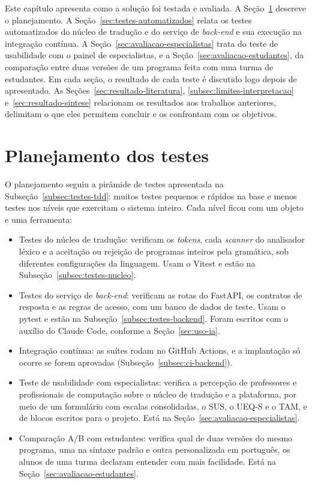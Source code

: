 Este capítulo apresenta como a solução foi testada e avaliada. A Seção~\ref{sec:planejamento-testes} descreve o planejamento. A Seção~\ref{sec:testes-automatizados} relata os testes automatizados do núcleo de tradução e do serviço de \textit{back-end} e sua execução na integração contínua. A Seção~\ref{sec:avaliacao-especialistas} trata do teste de usabilidade com o painel de especialistas, e a Seção~\ref{sec:avaliacao-estudantes}, da comparação entre duas versões de um programa feita com uma turma de estudantes. Em cada seção, o resultado de cada teste é discutido logo depois de apresentado. As Seções~\ref{sec:resultado-literatura}, \ref{subsec:limites-interpretacao} e~\ref{sec:resultado-sintese} relacionam os resultados aos trabalhos anteriores, delimitam o que eles permitem concluir e os confrontam com os objetivos.

\section{Planejamento dos testes}
\label{sec:planejamento-testes}

O planejamento seguiu a pirâmide de testes apresentada na Subseção~\ref{subsec:testes-tdd}: muitos testes pequenos e rápidos na base e menos testes nos níveis que exercitam o sistema inteiro. Cada nível ficou com um objeto e uma ferramenta:

\begin{itemize}
    \item Testes do núcleo de tradução: verificam os \textit{tokens}, cada \textit{scanner} do analisador léxico e a aceitação ou rejeição de programas inteiros pela gramática, sob diferentes configurações da linguagem. Usam o Vitest e estão na Subseção~\ref{subsec:testes-nucleo}.
    \item Testes do serviço de \textit{back-end}: verificam as rotas do FastAPI, os contratos de resposta e as regras de acesso, com um banco de dados de teste. Usam o pytest e estão na Subseção~\ref{subsec:testes-backend}. Foram escritos com o auxílio do Claude Code, conforme a Seção~\ref{sec:uso-ia}.
    \item Integração contínua: as suítes rodam no GitHub Actions, e a implantação só ocorre se forem aprovadas (Subseção~\ref{subsec:ci-backend}).
    \item Teste de usabilidade com especialistas: verifica a percepção de professores e profissionais de computação sobre o núcleo de tradução e a plataforma, por meio de um formulário com escalas consolidadas, o SUS, o UEQ-S e o TAM, e de blocos escritos para o projeto. Está na Seção~\ref{sec:avaliacao-especialistas}.
    \item Comparação A/B com estudantes: verifica qual de duas versões do mesmo programa, uma na sintaxe padrão e outra personalizada em português, os alunos de uma turma declaram entender com mais facilidade. Está na Seção~\ref{sec:avaliacao-estudantes}.
\end{itemize}

